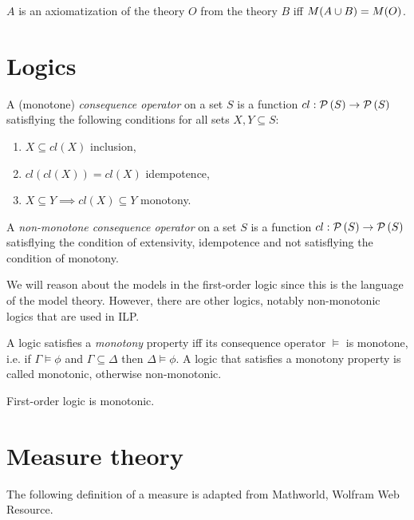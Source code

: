 \begin{defn}
$A$ is an axiomatization of the theory $O$ from the theory $B$ iff $M(A \cup B)=M(O)$.
\end{defn}

\section{Logics\cite{stanford2010}}
\begin{defn}
A (monotone) \emph{consequence operator}\cite{wikipediaClosureOperator} on a set $S$ is a function $cl:\mathcal{P} \left({ S }\right) \to \mathcal{P} \left({ S }\right)$ satisflying the following conditions for all sets $X, Y \subseteq S$:
\begin{enumerate}
\item $X \subseteq cl(X)$ inclusion,
\item $cl(cl(X))=cl(X)$ idempotence,
\item $X \subseteq{Y} \implies cl(X) \subseteq{Y}$ monotony.
\end{enumerate}
\end{defn}

\begin{defn}
A \emph{non-monotone consequence operator} on a set $S$ is a function
$cl:\mathcal{P} \left({ S }\right) \to \mathcal{P} \left({ S }\right)$ satisflying the condition of extensivity, idempotence and not satisflying the condition of monotony.
\end{defn}

We will reason about the models in the first-order logic since this is the language of the model theory. However, there are other logics, notably non-monotonic logics that are used in ILP.

\begin{defn}
A logic satisfies a \emph{monotony} property iff its consequence operator $\models$ is monotone, i.e.
if $\Gamma \models \phi$ and $\Gamma \subseteq \Delta$ then $\Delta \models \phi$. A logic that satisfies a monotony property is called monotonic, otherwise non-monotonic.
\end{defn}

\begin{exmp}
First-order logic is monotonic.
\end{exmp}

\section{Measure theory}
The following definition of a measure is adapted from Mathworld, Wolfram Web Resource\cite{wolframMathworldMeasure}.

